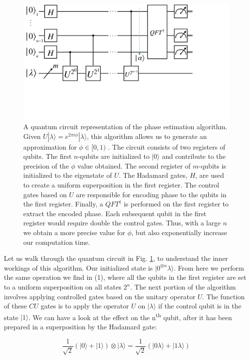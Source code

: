 \documentclass[msc,oneside]{ubcthesis}
\begin{document}
	
	\begin{figure}[!h]
		\centering
		\includegraphics[trim={1cm 12cm 11cm 0},clip, width=0.8 \linewidth]{"graphics/phase_circ"}
		\caption{A quantum circuit representation of the phase estimation algorithm. Given $ U |\lambda \rangle = e^{2\pi i \phi} |\lambda \rangle $, this algorithm allows us to generate an  approximation for $\phi \in [0,1)$ . The circuit consists of two registers of qubits. The first $n$-qubits are initialized to $|0\rangle$ and contribute to the precision of the $\phi$ value obtained. The second register of $m$-qubits is initialized to the eigenstate of $U$.  The Hadamard gates, $H$, are used to create a uniform superposition in the first register. The control gates based on $U$ are responsible for encoding phase to the qubits in the first register. Finally, a $QFT^\dagger$ is performed on the first register to extract the encoded phase. Each subsequent qubit in the first register would require double the control gates. Thus, with a large $n$ we obtain a more precise value for $\phi$, but also exponentially increase our computation time.}
		\label{fig:phasrcircuit}
	\end{figure}
	
	
	Let us walk through the quantum circuit in Fig. \ref{fig:phasrcircuit}, to understand the inner workings of this algorithm.	 Our initialized state is $|0^{\otimes n} \lambda\rangle$. From here we perform the same operation we find in (1), where all the qubits in the first register are set to a uniform superposition on all states $2^n$. The next portion of the algorithm involves applying controlled gates based on the unitary operator $U$. The function of these $CU$ gates is to apply the operator $U$ on $|\lambda\rangle$ if the control qubit is in the state $|1\rangle$. We can have a look at the effect on the n\textsuperscript{th} qubit, after it has been prepared in a superposition by the Hadamard gate:
	
	$$ \frac{1}{\sqrt{2}}(|0\rangle + |1\rangle) \otimes |\lambda\rangle =  \frac{1}{\sqrt{2}}(|0 \lambda \rangle + |1 \lambda\rangle)$$
	
\end{document}
